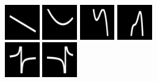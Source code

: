 \documentclass{article}
\begin{document}
\begin{figure}\vspace{-0.5cm} \newcommand{\functionSize}{1.5cm}\centering
  \includegraphics[width = \functionSize]{figures/functions/6.png}
  \includegraphics[width = \functionSize]{figures/functions/48.png}
  \includegraphics[width = \functionSize]{figures/functions/102.png}
  \includegraphics[width = \functionSize]{figures/functions/116.png}\\
  \vspace{1pt}\includegraphics[width = \functionSize]{figures/functions/181.png}
  \includegraphics[width = \functionSize]{figures/functions/160.png}

\end{figure}
\end{document}
